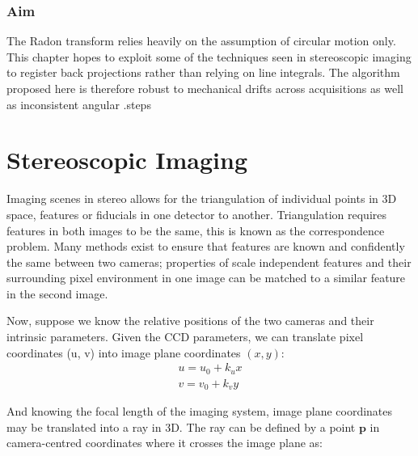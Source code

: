 \subsubsection{Aim}

The Radon transform relies heavily on the assumption of circular motion only.
This chapter hopes to exploit some of the techniques seen in stereoscopic imaging to register back projections rather than relying on line integrals.
The algorithm proposed here is therefore robust to mechanical drifts across acquisitions as well as inconsistent angular .steps

\section{Stereoscopic Imaging}





Imaging scenes in stereo allows for the triangulation of individual points in 3D space, features or fiducials in one detector to another.
Triangulation requires features in both images to be the same, this is known as the correspondence problem.
Many methods exist to ensure that features are known and confidently the same between two cameras; properties of scale independent features and their surrounding pixel environment in one image can be matched to a similar feature in the second image.

Now, suppose we know the relative positions of the two cameras and their intrinsic parameters.
Given the CCD parameters, we can translate pixel coordinates (u, v) into image plane coordinates $(x, y)$:
\begin{align}
    u = u_0 + k_u x \\
    v = v_0 + k_v y
\end{align}

And knowing the focal length of the imaging system, image plane coordinates may be translated into a ray in 3D.
The ray can be defined by a point $\textbf{p}$ in camera-centred coordinates where it crosses the image plane as:

